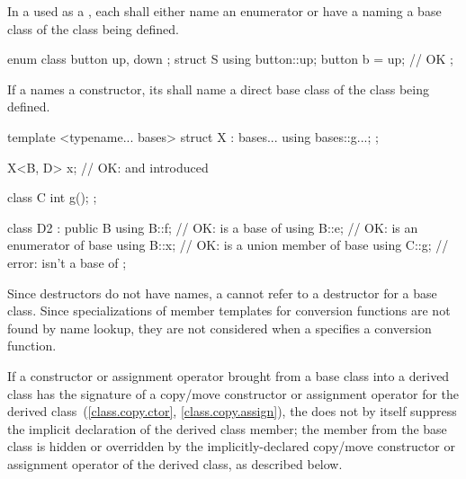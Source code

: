 \pnum
In a  used as a
,
each 
shall either name an enumerator
or have a 
naming a base class of the class being defined.
\begin{example}
\begin{codeblock}
enum class button { up, down };
struct S {
  using button::up;
  button b = up;                // OK
};
\end{codeblock}
\end{example}
If a
 names a constructor, its
 shall name a direct base class of the class
being defined.
\begin{example}
\begin{codeblock}
template <typename... bases>
struct X : bases... {
  using bases::g...;
};

X<B, D> x;                      // OK:  and  introduced
\end{codeblock}
\end{example}
\begin{example}
\begin{codeblock}
class C {
  int g();
};

class D2 : public B {
  using B::f;                   // OK:  is a base of 
  using B::e;                   // OK:  is an enumerator of base 
  using B::x;                   // OK:  is a union member of base 
  using C::g;                   // error:  isn't a base of 
};
\end{codeblock}
\end{example}

\pnum
\begin{note}
Since destructors do not have names, a
 cannot refer to a
destructor for a base class. Since specializations of member templates
for conversion functions are not found by name lookup, they are not
considered when a  specifies a conversion
function.
\end{note}
If a constructor or assignment operator brought from a base class into a derived class
has the signature of a copy/move constructor or assignment operator
for the derived class~(\ref{class.copy.ctor}, \ref{class.copy.assign}),
the  does not by itself
suppress the implicit declaration of the derived class member;
the member from the base class is hidden or overridden
by the implicitly-declared copy/move constructor or assignment operator
of the derived class, as described below.

